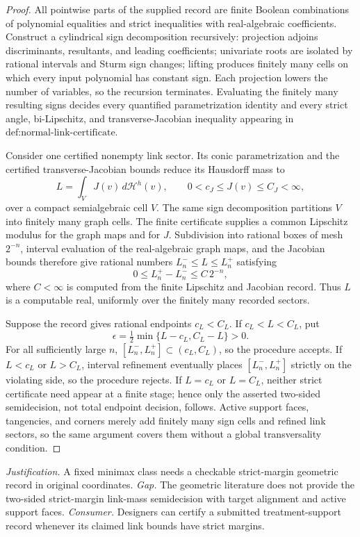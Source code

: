 \documentclass{article}
\begin{document}
\begin{proof}
All pointwise parts of the supplied record are finite Boolean combinations of polynomial equalities and strict inequalities with real-algebraic coefficients. Construct a cylindrical sign decomposition recursively: projection adjoins discriminants, resultants, and leading coefficients; univariate roots are isolated by rational intervals and Sturm sign changes; lifting produces finitely many cells on which every input polynomial has constant sign. Each projection lowers the number of variables, so the recursion terminates. Evaluating the finitely many resulting signs decides every quantified parametrization identity and every strict angle, bi-Lipschitz, and transverse-Jacobian inequality appearing in \(\text{def:normal-link-certificate}\).

Consider one certified nonempty link sector. Its conic parametrization and the certified transverse-Jacobian bounds reduce its Hausdorff mass to
\[
L=\int_V J(v)\,d\mathcal H^h(v),
\qquad 0<c_J\le J(v)\le C_J<\infty,
\]
over a compact semialgebraic cell \(V\). The same sign decomposition partitions \(V\) into finitely many graph cells. The finite certificate supplies a common Lipschitz modulus for the graph maps and for \(J\). Subdivision into rational boxes of mesh \(2^{-n}\), interval evaluation of the real-algebraic graph maps, and the Jacobian bounds therefore give rational numbers \(L_n^-\le L\le L_n^+\) satisfying
\[
0\le L_n^+-L_n^-\le C\,2^{-n},
\]
where \(C<\infty\) is computed from the finite Lipschitz and Jacobian record. Thus \(L\) is a computable real, uniformly over the finitely many recorded sectors.

Suppose the record gives rational endpoints \(c_L<C_L\). If \(c_L<L<C_L\), put
\[
\epsilon=\tfrac12\min\{L-c_L,C_L-L\}>0.
\]
For all sufficiently large \(n\), \([L_n^-,L_n^+]\subset(c_L,C_L)\), so the procedure accepts. If \(L<c_L\) or \(L>C_L\), interval refinement eventually places \([L_n^-,L_n^+]\) strictly on the violating side, so the procedure rejects. If \(L=c_L\) or \(L=C_L\), neither strict certificate need appear at a finite stage; hence only the asserted two-sided semidecision, not total endpoint decision, follows. Active support faces, tangencies, and corners merely add finitely many sign cells and refined link sectors, so the same argument covers them without a global transversality condition.
\end{proof}
\par\smallskip\noindent \textit{Justification.} A fixed minimax class needs a checkable strict-margin geometric record in original coordinates. \textit{Gap.} The geometric literature does not provide the two-sided strict-margin link-mass semidecision with target alignment and active support faces. \textit{Consumer.} Designers can certify a submitted treatment-support record whenever its claimed link bounds have strict margins.
\end{document}

